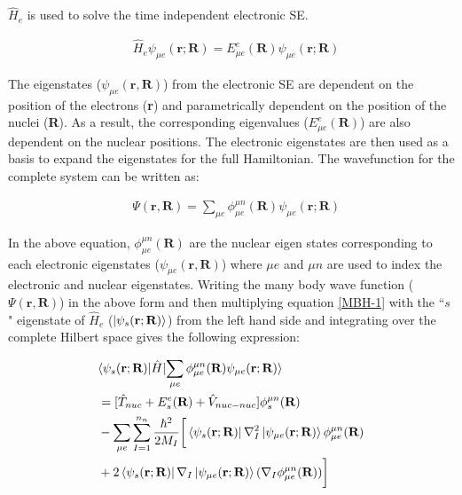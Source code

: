 \noindent $\hat{H}_{e}$ is used to solve the time independent electronic SE. 

\begin{align}
   \label{BOA-22}
      &\hat{H}_{e}\psi_{\mu e}(\textbf{r};\textbf{R})=E^{e}_{\mu e}(\textbf{R})\psi_{\mu e}(\textbf{r};\textbf{R})
\end{align} 

\noindent The eigenstates ($\psi_{\mu e}(\textbf{r},\textbf{R})$) from the electronic SE are dependent on the position of the electrons (\textbf{r}) and parametrically dependent on the position of the nuclei (\textbf{R}). As a result, the corresponding eigenvalues ($E^{e}_{\mu e}(\textbf{R})$) are also dependent on the nuclear positions. The electronic eigenstates are then used as a basis to expand the eigenstates for the full Hamiltonian. The wavefunction for the complete system can be written as:

\begin{align}
   \label{BOA-2}
      &\Psi(\textbf{r},\textbf{R})=\sum_{\mu e}^{} \phi_{\mu e}^{\mu n}(\textbf{R}) \psi_{\mu e} (\textbf{r};\textbf{R})
\end{align}

\noindent In the above equation, $ \phi_{\mu e}^{\mu n}(\textbf{R})$ are the nuclear eigen states corresponding to each electronic eigenstates ($\psi_{\mu e}(\textbf{r},\textbf{R})$) where $\mu e$ and $\mu n$ are used to index the electronic and nuclear eigenstates. Writing the many body wave function ($\Psi(\textbf{r},\textbf{R})$) in the above form and then multiplying equation \ref{MBH-1} with the ``$s$" eigenstate of $\hat{H}_e$ ($\ket{\psi_s(\textbf{r};\textbf{R})}$) from the left hand side and integrating over the complete Hilbert space gives the following expression:

\begin{align}
   \label{BOA-3}
   &\langle{\psi_s}(\textbf{r};\textbf{R})|\hat{H}|{\sum_{\mu e}\phi_{\mu e}^{\mu n}(\textbf{R}) \psi_{\mu e} (\textbf{r};\textbf{R})}\rangle \notag \\
   &= [\hat{T}_{nuc}+E^{e}_{s}(\textbf{R})+\hat{V}_{nuc-nuc}] \phi_{s}^{\mu n}(\textbf{R}) \notag\\
   &- \sum_{\mu e}^{} \sum_{I=1}^{n_n} \frac{\hbar^2}{2M_I}\bigg [\bra{\psi_s(\textbf{r};\textbf{R})}\nabla^2_I\ket{\psi_{\mu e}(\textbf{r};\textbf{R})}\phi_{\mu e}^{\mu n}(\textbf{R}) \notag \\
   &+ 2\bra{\psi_s(\textbf{r};\textbf{R})}\nabla_I\ket{\psi_{\mu e}(\textbf{r};\textbf{R})} (\nabla_I\phi_{\mu e}^{\mu n}(\textbf{R}))\bigg ]   
\end{align}

